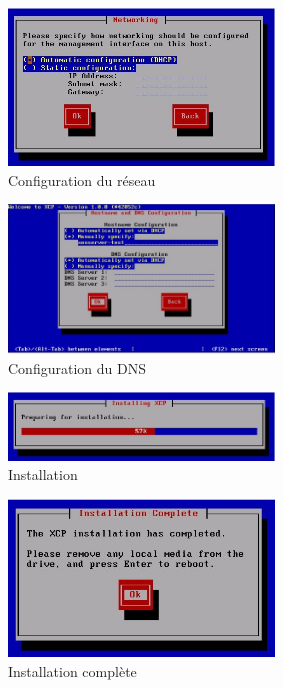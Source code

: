 \begin{figure}
\begin{center}
\includegraphics[width=200pt]{images/8.png}
\end{center}
\caption{Configuration du réseau}
\end{figure}
\begin{figure}
\begin{center}
\includegraphics[width=200pt]{images/9.png}
\end{center}
\caption{Configuration du DNS}
\end{figure}
\begin{figure}
\begin{center}
\includegraphics[width=200pt]{images/10.png}
\end{center}
\caption{Installation}
\end{figure}
\begin{figure}
\begin{center}
\includegraphics[width=200pt]{images/11.png}
\end{center}
\caption{Installation complète}
\end{figure}
